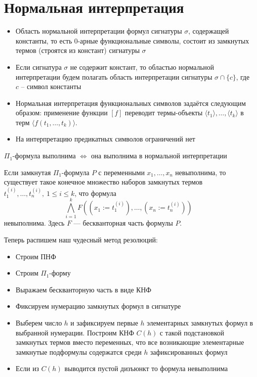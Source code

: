 \documentclass[11pt]{article}
\begin{document}
\section{Нормальная интерпретация}
\begin{itemize}
    \item Область нормальной интерпретации формул сигнатуры $\sigma$, содержащей
    константы, то есть 0-арные функциональные символы, состоит из замкнутых
    термов (строятся из констант) сигнатуры $\sigma$
    \item Если сигнатура $\sigma$ не содержит констант, то областью нормальной
    интерпретации будем полагать область интерпретации сигнатуры $\sigma \cap \{c\}$,
    где $c$ -- символ константы
    \item Нормальная интерпретация функциональных символов задаётся следующим 
    образом: применение функции $[f]$ переводит термы-объекты $\langle t_1 \rangle,
    \dots, \langle t_k \rangle$ в терм $\langle f(t_1, \dots, t_k) \rangle$.
    \item На интерпретацию предикатных символов ограничений нет
\end{itemize}

\begin{theorem}
    $\Pi_1$-формула выполнима $\Longleftrightarrow$ она выполнима 
    в нормальной интерпретации
\end{theorem}

\begin{theorem}[Эрбрана]
    Если замкнутая $\Pi_1$-формула $P$ с переменными $x_1, \dots, x_n$
    невыполнима, то существует такое конечное множество наборов
    замкнутых термов $t_1^{(i)}, \dots, t_n^{(i)}, \ 1 \leq i \leq k$, 
    что формула \[\bigwedge_{i = 1}^k F((x_1 := t_1^{(i)}), \dots, (x_n := t_n^{(i)}))\] 
    невыполнима. Здесь $F$ --- бескванторная часть формулы $P$.
\end{theorem}

Теперь распишем наш чудесный метод резолюций:
\begin{itemize}
    \item Строим ПНФ 
    \item Строим $\Pi_1$-форму
    \item Выражаем бескванторную часть в виде КНФ 
    \item Фиксируем нумерацию замкнутых формул в сигнатуре 
    \item Выберем число $h$ и зафиксируем первые $h$ элементарных замкнутых формул 
    в выбранной нумерации. Построим КНФ $C(h)$ с такой подстановкой замкнутых термов 
    вместо переменных, что все возникающие элементарные замкнутые подформулы содержатся среди
    $h$ зафиксированных формул 
    \item Если из $C(h)$ выводится пустой дизъюнкт то формула невыполнима
\end{itemize}
\end{document}
